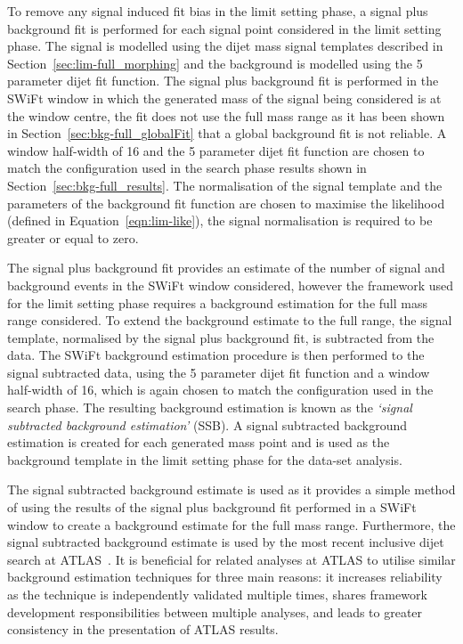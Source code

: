 To remove any signal induced fit bias in the limit setting phase, a signal plus background fit
is performed for each signal point considered in the limit setting phase.
The signal is modelled using the dijet mass signal templates described in Section~\ref{sec:lim-full_morphing}
and the background is modelled using the 5 parameter dijet fit function.
The signal plus background fit is performed in the SWiFt window in which the generated mass of the signal being considered is at the window centre,
the fit does not use the full mass range as it has been shown in Section~\ref{sec:bkg-full_globalFit} that a global background fit is not reliable.
A window half-width of 16 and the 5 parameter dijet fit function are chosen to match the configuration used in the search phase results shown in Section~\ref{sec:bkg-full_results}.
The normalisation of the signal template and the parameters of the background fit function are
chosen to maximise the likelihood (defined in Equation~\ref{eqn:lim-like}), the signal normalisation is required to be greater or equal to zero.

The signal plus background fit provides an estimate of the number of signal and background events in the SWiFt window considered,
however the framework used for the limit setting phase requires a background estimation for the full mass range considered.
To extend the background estimate to the full range, the signal template, normalised by the signal plus background fit, is subtracted from the data.
The SWiFt background estimation procedure is then performed to the signal subtracted data,
using the 5 parameter dijet fit function and a window half-width of 16, which is again chosen to match the configuration used in the search phase.
The resulting background estimation is known as the \textit{`signal subtracted background estimation'} (SSB).
A signal subtracted background estimation is created for each generated mass point and
is used as the background template in the limit setting phase for the \lm{} data-set analysis.

The signal subtracted background estimate is used as it provides a simple method of using the results of the signal plus background fit
performed in a SWiFt window to create a background estimate for the full mass range. 
Furthermore, the signal subtracted background estimate is used by the most recent inclusive dijet search at ATLAS~\cite{dijet-mori17_paper}.
It is beneficial for related analyses at ATLAS to utilise similar background estimation techniques for three main reasons:
it increases reliability as the technique is independently validated multiple times,
shares framework development responsibilities between multiple analyses,
and leads to greater consistency in the presentation of ATLAS results.

